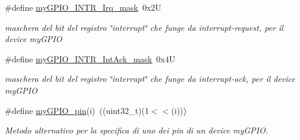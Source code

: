 \begin{DoxyCompactItemize}
\#define \hyperlink{group__my_g_p_i_o_ga4cd02635783bc2a4ad7639cfb9fdb698}{my\+G\+P\+I\+O\+\_\+\+I\+N\+T\+R\+\_\+\+Irq\+\_\+mask}~0x2\+U
\begin{DoxyCompactList}\small\item\em maschera del bit del registro \char`\"{}interrupt\char`\"{} che funge da interrupt-\/request, per il device my\+G\+P\+I\+O \end{DoxyCompactList}\item 
\#define \hyperlink{group__my_g_p_i_o_gaa760b8397e6372e48c1008c2ba8d7387}{my\+G\+P\+I\+O\+\_\+\+I\+N\+T\+R\+\_\+\+Int\+Ack\+\_\+mask}~0x4\+U
\begin{DoxyCompactList}\small\item\em maschera del bit del registro \char`\"{}interrupt\char`\"{} che funge da interrupt-\/ack, per il device my\+G\+P\+I\+O \end{DoxyCompactList}\item 
\#define \hyperlink{group__my_g_p_i_o_gabbe2491a3b71c292521025b7b382b971}{my\+G\+P\+I\+O\+\_\+pin}(i)~((uint32\+\_\+t)(1$<$$<$(i)))
\begin{DoxyCompactList}\small\item\em Metodo alternativo per la specifica di uno dei pin di un device my\+G\+P\+I\+O. \end{DoxyCompactList}\end{DoxyCompactItemize}
